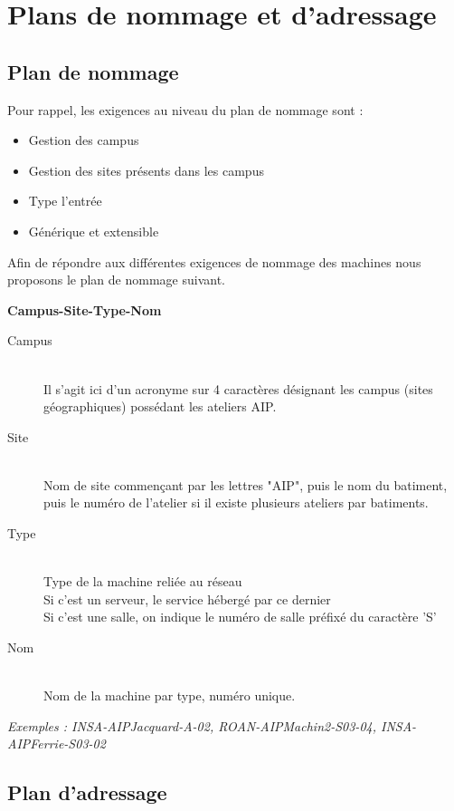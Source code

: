 \documentclass[a4paper]{article}
\begin{document}
	
\section{Plans de nommage et d'adressage}
	\subsection{Plan de nommage}

	Pour rappel, les exigences au niveau du plan de nommage sont :\\
	\begin{itemize}
	\item Gestion des campus
	\item Gestion des sites présents dans les campus
	\item Type l'entrée
	\item Générique et extensible
	\end{itemize}	

	Afin de répondre aux différentes exigences de nommage des machines nous proposons le plan de nommage suivant.	
	
	\textbf{Campus-Site-Type-Nom}	
	
	\begin{description}
	\item[Campus]\hfill\\
	Il s'agit ici d'un acronyme sur 4 caractères désignant les campus (sites géographiques) possédant les ateliers AIP.\\
	
	\item[Site]\hfill\\
	Nom de site commençant par les lettres "AIP", puis le nom du batiment, puis le numéro de l'atelier si il existe plusieurs ateliers par batiments.
	
	\item[Type]\hfill\\
	Type de la machine reliée au réseau\\
	Si c'est un serveur, le service hébergé par ce dernier\\
	Si c'est une salle, on indique le numéro de salle préfixé du caractère 'S'\\
	
	\item[Nom]\hfill\\
	Nom de la machine par type, numéro unique.
	\end{description}	
	
	\textit{Exemples : INSA-AIPJacquard-A-02, ROAN-AIPMachin2-S03-04, INSA-AIPFerrie-S03-02}	
	
	\subsection{Plan d'adressage}
	
	
	
\end{document}
